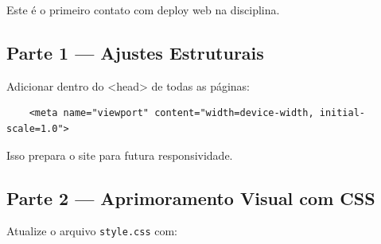 \documentclass[12pt,a4paper]{article}
\begin{document}
    Este é o primeiro contato com deploy web na disciplina.
    
    
    \subsection{Parte 1 — Ajustes Estruturais}
    
    Adicionar dentro do <head> de todas as páginas:
    
    \begin{boxCodigo}
    \begin{verbatim}
    <meta name="viewport" content="width=device-width, initial-scale=1.0">
    \end{verbatim}
    \end{boxCodigo}
    
    Isso prepara o site para futura responsividade.

    
    \subsection{Parte 2 — Aprimoramento Visual com CSS}
    
        Atualize o arquivo \texttt{style.css} com:
        
\end{document}
